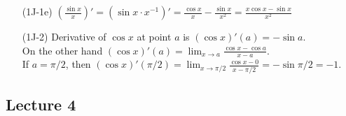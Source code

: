 \documentclass{article}
\begin{document}
\begin{itemize}
\item[(1J-1e)] $ \left( \frac{\sin x}{x} \right)' = \left( \sin x \cdot x^{-1} \right)' = \frac{\cos x}{x} - \frac{\sin x}{x^2} = \frac{x\cos x - \sin x}{x^2}$

\item[(1J-2)] Derivative of $\cos x$ at point $a$ is $(\cos x)'\left( a \right) = -\sin a$. \\
On the other hand $(\cos x)'\left( a \right) = \lim_{x \to a}\frac{\cos x - \cos a}{x - a}$. \\ 
If $a = \pi / 2$, then $(\cos x)'\left( \pi/2 \right)  = \lim_{x \to \pi/2}\frac{\cos x - 0}{x - \pi/2} = -\sin \pi/2 = -1$.

\end{itemize}

\subsection{Lecture 4}
\end{document}
